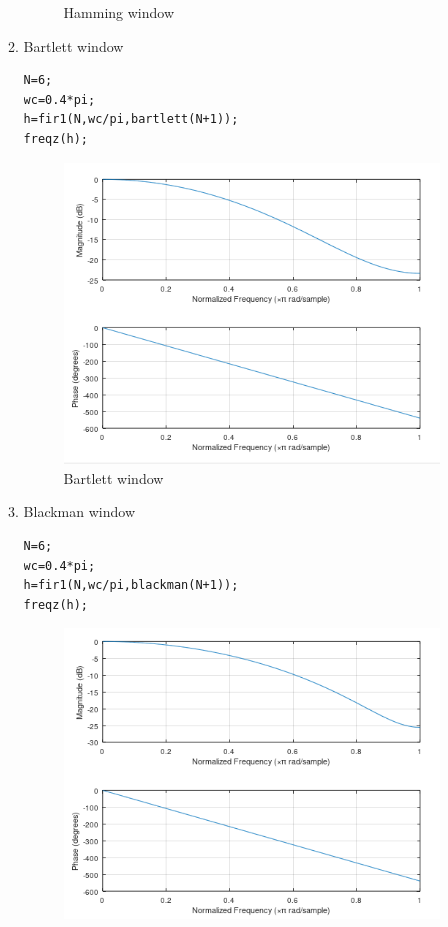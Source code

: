 \documentclass[12pt]{article}
\begin{document}
\begin{enumerate}
\begin{enumerate}
\begin{figure}[h!]
        \caption{Hamming window}
    \end{figure}
    \pagebreak
    \item Bartlett window
    \begin{Verbatim}[frame = single]
N=6;
wc=0.4*pi;
h=fir1(N,wc/pi,bartlett(N+1));
freqz(h);
    \end{Verbatim}
    \begin{figure}[h!]
        \centering
        \includegraphics{labss/Lab6_5d.PNG}
        \caption{Bartlett window}
    \end{figure}
    \pagebreak
    \item Blackman window
    \begin{Verbatim}[frame = single]
N=6;
wc=0.4*pi;
h=fir1(N,wc/pi,blackman(N+1));
freqz(h);
    \end{Verbatim}
    \begin{figure}[h!]
        \centering
        \includegraphics{labss/Lab6_5e.PNG}

\end{figure}
\end{enumerate}
\end{enumerate}
\end{document}
